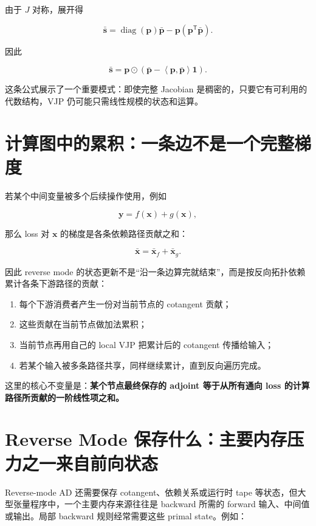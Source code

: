 \documentclass[profile=standard,twoside=false]{ipara-handbook}
\begin{document}
由于 $J$ 对称，展开得

$$
\bar{\boldsymbol{s}}
=\operatorname{diag}(\boldsymbol{p})\bar{\boldsymbol{p}}
-\boldsymbol{p}(\boldsymbol{p}^{\mathsf T}\bar{\boldsymbol{p}}).
$$

因此

$$
\boxed{
\bar{\boldsymbol{s}}
=\boldsymbol{p}\odot
\left(
\bar{\boldsymbol{p}}
-\left\langle\boldsymbol{p},\bar{\boldsymbol{p}}\right\rangle\boldsymbol{1}
\right)
}.
$$

这条公式展示了一个重要模式：即使完整 Jacobian 是稠密的，只要它有可利用的代数结构，VJP 仍可能只需线性规模的状态和运算。

\section{计算图中的累积：一条边不是一个完整梯度}

若某个中间变量被多个后续操作使用，例如

$$
\boldsymbol{y}=f(\boldsymbol{x})+g(\boldsymbol{x}),
$$

那么 loss 对 $\boldsymbol{x}$ 的梯度是各条依赖路径贡献之和：

$$
\bar{\boldsymbol{x}}
=\bar{\boldsymbol{x}}_{f}
+\bar{\boldsymbol{x}}_{g}.
$$

因此 reverse mode 的状态更新不是“沿一条边算完就结束”，而是按反向拓扑依赖累计各条下游路径的贡献：

\begin{enumerate}
  \item 每个下游消费者产生一份对当前节点的 cotangent 贡献；
  \item 这些贡献在当前节点做加法累积；
  \item 当前节点再用自己的 local VJP 把累计后的 cotangent 传播给输入；
  \item 若某个输入被多条路径共享，同样继续累计，直到反向遍历完成。
\end{enumerate}

这里的核心不变量是：\textbf{某个节点最终保存的 adjoint 等于从所有通向 loss 的计算路径所贡献的一阶线性项之和。}

\section{Reverse Mode 保存什么：主要内存压力之一来自前向状态}

Reverse-mode AD 还需要保存 cotangent、依赖关系或运行时 tape 等状态，但大型张量程序中，一个主要内存来源往往是 backward 所需的 forward 输入、中间值或输出。局部 backward 规则经常需要这些 primal state。例如：
\end{document}
